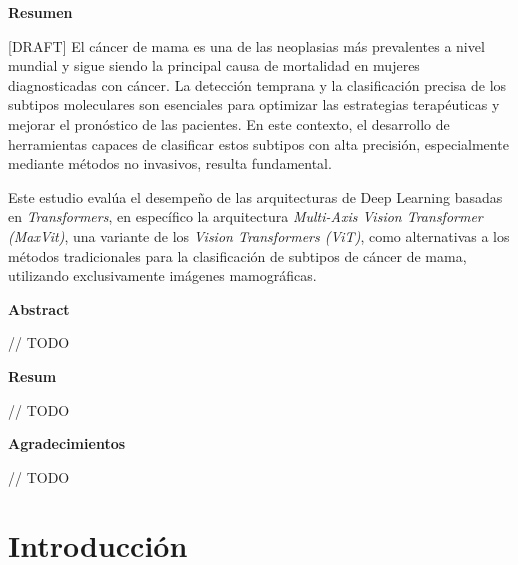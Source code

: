\documentclass[a4paper,10pt]{book}
\begin{document}
\newpage
{}
\noindent \textbf{\large Resumen}

[DRAFT] El cáncer de mama es una de las neoplasias más prevalentes a nivel mundial y sigue siendo la principal causa de mortalidad en mujeres diagnosticadas con cáncer. La detección temprana y la clasificación precisa de los subtipos moleculares son esenciales para optimizar las estrategias terapéuticas y mejorar el pronóstico de las pacientes. En este contexto, el desarrollo de herramientas capaces de clasificar estos subtipos con alta precisión, especialmente mediante métodos no invasivos, resulta fundamental.

Este estudio evalúa el desempeño de las arquitecturas de Deep Learning basadas en \textit{Transformers}, en específico la arquitectura \textit{Multi-Axis Vision Transformer (MaxVit)}, una variante de los \textit{Vision Transformers (ViT)}, como alternativas a los métodos tradicionales para la clasificación de subtipos de cáncer de mama, utilizando exclusivamente imágenes mamográficas.


\newpage
{}
\noindent \textbf{\large Abstract}

// TODO


\newpage
{}
\noindent \textbf{\large Resum}

// TODO

\newpage
{}
\noindent \textbf{\large Agradecimientos}

// TODO
 \setcounter{page}{0}
\let\cleardoublepage\clearpage
\tableofcontents
\newpage \thispagestyle{empty}

\pagestyle{fancy}
\newpage \thispagestyle{empty}
\mainmatter
\chapter{Introducción}
\end{document}
